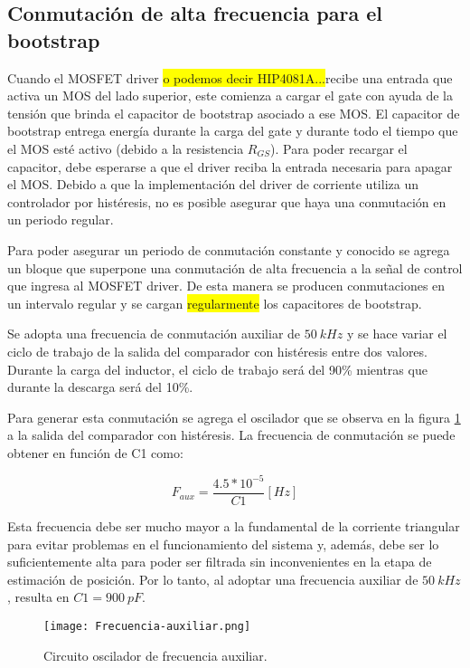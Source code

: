 \subsection{Conmutación de alta frecuencia para el bootstrap}

\noindent Cuando el MOSFET driver \colorbox{yellow}{o podemos decir HIP4081A...}recibe una entrada que activa un MOS del lado superior, este comienza a cargar el gate con ayuda de la tensión que brinda el capacitor de bootstrap asociado a ese MOS. El capacitor de bootstrap entrega energía durante la carga del gate y durante todo el tiempo que el MOS esté activo (debido a la resistencia $R_{GS}$). Para poder recargar el capacitor, debe esperarse a que el driver reciba la entrada necesaria para apagar el MOS. Debido a que la implementación del driver de corriente utiliza un controlador por histéresis, no es posible asegurar que haya una conmutación en un periodo regular.

\noindent Para poder asegurar un periodo de conmutación constante y conocido se agrega un bloque que superpone una conmutación de alta frecuencia a la señal de control que ingresa al MOSFET driver. De esta manera se producen conmutaciones en un intervalo regular y se cargan \colorbox{yellow}{regularmente} los capacitores de bootstrap. 

\noindent Se adopta una frecuencia de conmutación auxiliar de $50\:kHz$ y se hace variar el ciclo de trabajo de la salida del comparador con histéresis entre dos valores. Durante la carga del inductor, el ciclo de trabajo será del 90\% mientras que durante la descarga será del 10\%.

\noindent Para generar esta conmutación se agrega el oscilador que se observa en la figura \ref{fig:img_frecuencia-auxiliar} a la salida del comparador con histéresis. La frecuencia de conmutación se puede obtener en función de C1 como:

\begin{equation} 
	F_{aux} = \frac{4.5*10^{-5}}{C1} [Hz]
\end{equation}


\noindent Esta frecuencia debe ser mucho mayor a la fundamental de la corriente triangular para evitar problemas en el funcionamiento del sistema y, además, debe ser lo suficientemente alta para poder ser filtrada sin inconvenientes en la etapa de estimación de posición. Por lo tanto, al adoptar una frecuencia auxiliar de $50\:kHz$, resulta en $C1= 900 \:pF$.

\begin{figure}[H]
	\centering
	\texttt{[image: Frecuencia-auxiliar.png]}
	\caption{Circuito oscilador de frecuencia auxiliar.}
	\label{fig:img_frecuencia-auxiliar}
\end{figure}


